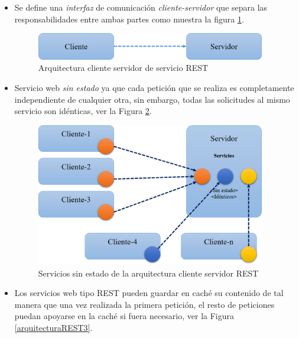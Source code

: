 \begin{itemize}
    \item Se define una \emph{interfaz} de comunicaci\'on \emph{cliente-servidor} que separa las res\-pon\-sa\-bi\-li\-da\-des entre ambas partes como muestra la figura \ref{arquitecturaREST1}.
    
        \begin{figure}[!ht]
        \centering
        \includegraphics[width=10cm]{figures/ClienteServidorREST.png} 
        \caption{Arquitectura cliente servidor de servicio REST} 
        \label{arquitecturaREST1}
    \end{figure}

 \item Servicio web \emph{sin estado} ya que  cada petici\'on que se realiza es completamente independiente de cualquier otra, sin embargo, todas las solicitudes al mismo servicio son id\'enticas,  ver la Figura \ref{arquitecturaREST2}.
    
    \begin{figure}[!ht]
        \centering
        \includegraphics[width=10cm]{figures/ClienteServidorREST2.png} %
        \caption{Servicios sin estado de la arquitectura cliente servidor REST} %
        \label{arquitecturaREST2}
    \end{figure}
    
    \item Los servicios web tipo REST pueden guardar en cach\'e su contenido de tal manera que una vez realizada la primera petici\'on, el resto de peticiones puedan apoyarse en la cach\'e si fuera necesario,  ver la Figura \ref{arquitecturaREST3}.
    

\end{itemize}
